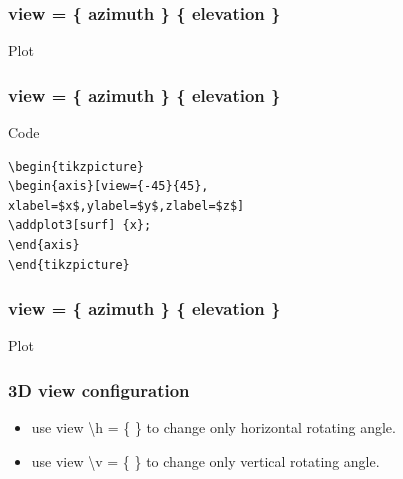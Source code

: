 \documentclass{beamer}
\begin{document}
\begin{frame}[fragile]
\frametitle{\color{blue} view \color{black} = \{ azimuth \} \{ elevation \}}
\begin{block}{Plot}
\end{block}
\end{frame}
\begin{frame}[fragile]
\frametitle{\color{blue} view \color{black} = \{ azimuth \} \{ elevation \}}
\begin{block}{Code}
\begin{verbatim}
\begin{tikzpicture}
\begin{axis}[view={-45}{45},
xlabel=$x$,ylabel=$y$,zlabel=$z$]
\addplot3[surf] {x};
\end{axis}
\end{tikzpicture}
\end{verbatim}
\end{block}
\end{frame}
\begin{frame}[fragile]
\frametitle{\color{blue} view \color{black} = \{ azimuth \} \{ elevation \}}
\begin{block}{Plot}
\end{block}
\end{frame}
\begin{frame}[fragile]
\frametitle{3D view configuration}
\begin{itemize}
\item use \color{blue} view \textbackslash h \color{black} = \{ \} to change only horizontal rotating angle.
\item use \color{blue} view \textbackslash v \color{black} = \{ \} to change only vertical rotating angle.
\end{itemize}
\end{frame}
\begin{frame}[fragile]
\vfill
{}
\vfill
\end{frame}
\end{document}
